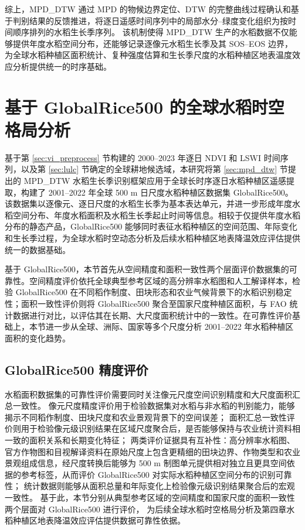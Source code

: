 综上，MPD\_DTW 通过 MPD 的物候边界定位、DTW 的完整曲线过程确认和基于判别结果的反馈推进，将逐日遥感时间序列中的局部水分--绿度变化组织为按时间顺序排列的水稻生长季序列。
该机制使得 MPD\_DTW 生产的水稻数据不仅能够提供年度水稻空间分布，还能够记录逐像元水稻生长季及其 SOS--EOS 边界，为全球水稻种植区面积统计、复种强度估算和生长季尺度的水稻种植区地表温度效应分析提供统一的时序基础。


\section{基于 GlobalRice500 的全球水稻时空格局分析}
基于第 \ref{sec:vi_preprocess} 节构建的 2000--2023 年逐日 NDVI 和 LSWI 时间序列，以及第 \ref{sec:lulc} 节确定的全球耕地候选域，本研究将第 \ref{sec:mpd_dtw} 节提出的 MPD\_DTW 水稻生长季识别框架应用于全球长时序逐日水稻种植区遥感提取，构建了 2001--2022 年全球 500 m 日尺度水稻种植区数据集 GlobalRice500。该数据集以逐像元、逐日尺度的水稻生长季为基本表达单元，并进一步形成年度水稻空间分布、年度水稻面积及水稻生长季起止时间等信息。相较于仅提供年度水稻分布的静态产品，GlobalRice500 能够同时表征水稻种植区的空间范围、年际变化和生长季过程，为全球水稻时空动态分析及后续水稻种植区地表降温效应评估提供统一的数据基础。

基于 GlobalRice500，本节首先从空间精度和面积一致性两个层面评价数据集的可靠性。空间精度评价依托全球典型参考区域的高分辨率水稻图和人工解译样本，检验 GlobalRice500 在不同稻作制度、田块形态和农业气候背景下的水稻识别稳定性；面积一致性评价则将 GlobalRice500 聚合至国家尺度种植区面积，与 FAO 统计数据进行对比，以评估其在长期、大尺度面积统计中的一致性。在可靠性评价基础上，本节进一步从全球、洲际、国家等多个尺度分析 2001--2022 年水稻种植区面积的变化趋势。

\subsection{GlobalRice500 精度评价}
水稻面积数据集的可靠性评价需要同时关注像元尺度空间识别精度和大尺度面积汇总一致性。
像元尺度精度评价用于检验数据集对水稻与非水稻的判别能力，能够揭示不同稻作制度、田块尺度和农业景观背景下的空间误差；
面积汇总一致性评价则用于检验像元级识别结果在区域尺度聚合后，是否能够保持与农业统计资料相一致的面积关系和长期变化特征；
两类评价证据具有互补性：高分辨率水稻图、官方作物图和目视解译资料在原始尺度上包含更精细的田块边界、作物类型和农业景观组成信息，经尺度转换后能够为 500 m 制图单元提供相对独立且更具空间依据的参考标签，从而评价 GlobalRice500 对实际水稻种植区空间分布的识别可靠性；
统计数据则能够从面积总量和年际变化上检验像元级识别结果聚合后的宏观一致性。
基于此，本节分别从典型参考区域的空间精度和国家尺度的面积一致性两个层面对 GlobalRice500 进行评价，
为后续全球水稻时空格局分析及第四章水稻种植区地表降温效应评估提供数据可靠性依据。

